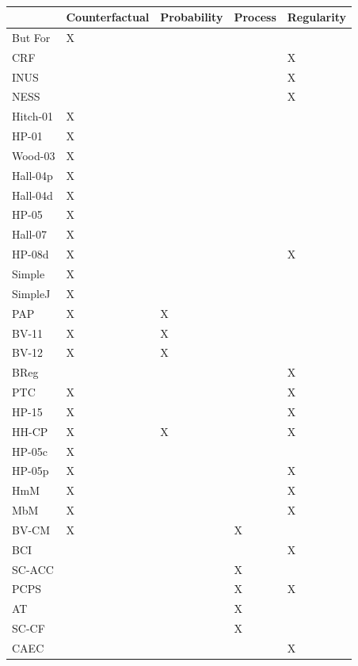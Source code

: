\documentclass[11pt,a4paper]{book}
\theoremstyle{definition}
\theoremstyle{definition}
\theoremstyle{definition}
\theoremstyle{remark}
\begin{document}
\begin{table}
\centering
\scriptsize
\begin{tabular}{lllll}
\toprule
	 & Counterfactual	 & Probability	 & Process	 & ﻿Regularity	\\
	 \midrule
But For	& X	& 	& 	& 	\\
CRF	& 	& 	& 	& X	\\
INUS	& 	& 	& 	& X	\\
NESS	& 	& 	& 	& X	\\
Hitch-01	& X	& 	& 	& 	\\
HP-01	& X	& 	& 	& 	\\
Wood-03	& X	& 	& 	& 	\\
Hall-04p	& X	& 	& 	& 	\\
Hall-04d	& X	& 	& 	& 	\\
HP-05	& X	& 	& 	& 	\\
Hall-07	& X	& 	& 	& 	\\
HP-08d	& X	& 	& 	& X	\\
Simple	& X	& 	& 	& 	\\
SimpleJ	& X	& 	& 	& 	\\
PAP	& X	& X	& 	& 	\\
BV-11	& X	& X	& 	& 	\\
BV-12	& X	& X	& 	& 	\\
BReg	& 	& 	& 	& X	\\
PTC	& X	& 	& 	& X	\\
HP-15	& X	& 	& 	& X	\\
HH-CP	& X	& X	& 	& X	\\
HP-05c	& X	& 	& 	& 	\\
HP-05p	& X	& 	& 	& X	\\
HmM	& X	& 	& 	& X	\\
MbM	& X	& 	& 	& X	\\
BV-CM	& X	& 	& X	& 	\\
BCI	& 	& 	& 	& X	\\
SC-ACC	& 	& 	& X	& 	\\
PCPS	& 	& 	& X	& X	\\
AT	& 	& 	& X	& 	\\
SC-CF	& 	& 	& X	& 	\\
CAEC	& 	& 	& 	& X	\\
\bottomrule
\end{tabular}
\caption{}
\label{tab:definition_overview}
\end{table}
\end{document}
